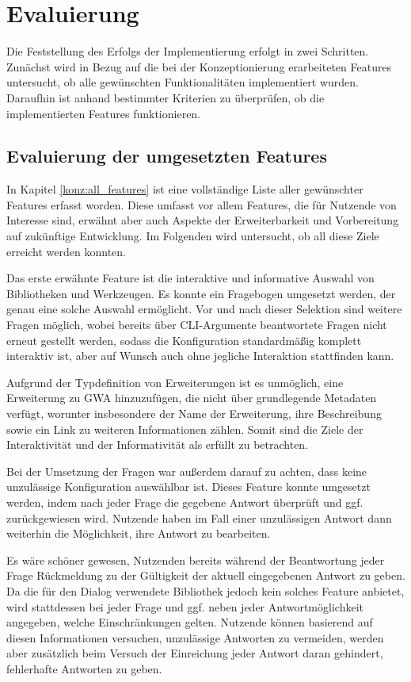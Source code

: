 \section{Evaluierung}
\label{eval}
Die Feststellung des Erfolgs der Implementierung erfolgt in zwei Schritten. Zunächst wird in Bezug auf die bei der Konzeptionierung erarbeiteten Features untersucht, ob alle gewünschten Funktionalitäten implementiert wurden. Daraufhin ist anhand bestimmter Kriterien zu überprüfen, ob die implementierten Features funktionieren.

\subsection{Evaluierung der umgesetzten Features}
In Kapitel \ref{konz:all_features} ist eine vollständige Liste aller gewünschter Features erfasst worden. Diese umfasst vor allem Features, die für Nutzende von Interesse sind, erwähnt aber auch Aspekte der Erweiterbarkeit und Vorbereitung auf zukünftige Entwicklung. Im Folgenden wird untersucht, ob all diese Ziele erreicht werden konnten.

Das erste erwähnte Feature ist die interaktive und informative Auswahl von Bibliotheken und Werkzeugen. Es konnte ein Fragebogen umgesetzt werden, der genau eine solche Auswahl ermöglicht. Vor und nach dieser Selektion sind weitere Fragen möglich, wobei bereits über \gls{CLI}-Argumente beantwortete Fragen nicht erneut gestellt werden, sodass die Konfiguration standardmäßig komplett interaktiv ist, aber auf Wunsch auch ohne jegliche Interaktion stattfinden kann.

Aufgrund der Typdefinition von Erweiterungen ist es unmöglich, eine Erweiterung zu \gls{GWA} hinzuzufügen, die nicht über grundlegende Metadaten verfügt, worunter insbesondere der Name der Erweiterung, ihre Beschreibung sowie ein Link zu weiteren Informationen zählen. Somit sind die Ziele der Interaktivität und der Informativität als erfüllt zu betrachten.

Bei der Umsetzung der Fragen war außerdem darauf zu achten, dass keine unzulässige Konfiguration auswählbar ist. Dieses Feature konnte umgesetzt werden, indem nach jeder Frage die gegebene Antwort überprüft und ggf. zurückgewiesen wird. Nutzende haben im Fall einer unzulässigen Antwort dann weiterhin die Möglichkeit, ihre Antwort zu bearbeiten.

Es wäre schöner gewesen, Nutzenden bereits während der Beantwortung jeder Frage Rückmeldung zu der Gültigkeit der aktuell eingegebenen Antwort zu geben. Da die für den Dialog verwendete Bibliothek jedoch kein solches Feature anbietet, wird stattdessen bei jeder Frage und ggf. neben jeder Antwortmöglichkeit angegeben, welche Einschränkungen gelten. Nutzende können basierend auf diesen Informationen versuchen, unzulässige Antworten zu vermeiden, werden aber zusätzlich beim Versuch der Einreichung jeder Antwort daran gehindert, fehlerhafte Antworten zu geben.

